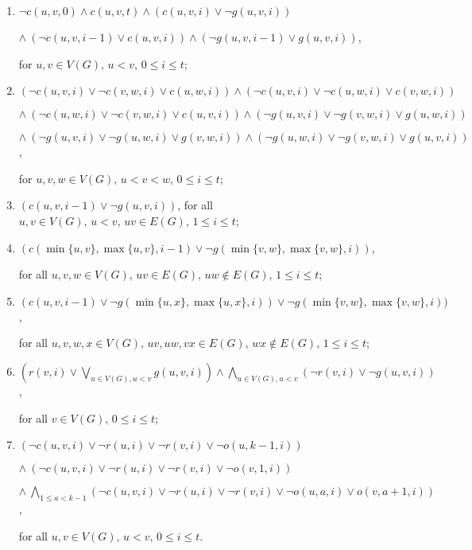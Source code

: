 \begin{enumerate}
	\item $\neg c(u,v,0) \land c(u,v,t) \land (c(u,v,i) \lor \neg g(u,v,i)) $ \vspace{-4pt}
	
	$\land \ (\neg c(u,v,i-1) \lor c(u,v,i))\land (\neg g(u,v,i-1) \lor g(u,v,i))$,
	
	for $u,v \in V(G),\, u<v,\, 0 \leq i \leq t$;
	
	\item $(\neg c(u,v,i) \lor \neg c(v,w,i) \lor c(u,w,i)) \land (\neg c(u,v,i) \lor \neg c(u,w,i) \lor c(v,w,i))$ \vspace{-4pt}
	
	$\land \ (\neg c(u,w,i) \lor \neg c(v,w,i) \lor c(u,v,i)) \land (\neg g(u,v,i) \lor \neg g(v,w,i) \lor g(u,w,i))$ \vspace{-16pt}
	
	$\land \ (\neg g(u,v,i) \lor \neg g(u,w,i) \lor g(v,w,i)) \land (\neg g(u,w,i) \lor \neg g(v,w,i) \lor g(u,v,i))$, \vspace{-12pt}
	
	for $u,v,w \in V(G),\, u<v<w,\, 0 \leq i \leq t$;
	
	\item $(c(u,v,i-1) \lor \neg g(u,v,i))$, for all $u,v \in V(G),\, u<v,\, uv \in E(G),\, 1 \leq i \leq t$;
	
	\item $(c(\min\{u,v\}, \max\{u,v\}, i-1) \lor \neg g(\min\{v,w\}, \max\{v,w\}, i))$,
	
	for all $u,v,w \in V(G),\, uv \in E(G),\, uw \not\in E(G),\, 1 \leq i \leq t$;
	
	\item $(c(u,v,i-1) \lor \neg g(\min\{u,x\}, \max\{u,x\}, i) ) \lor \neg g(\min\{v,w\}, \max\{v,w\}, i) )$,
	
	for all $u,v,w,x \in V(G),\, uv,uw,vx \in E(G),\, wx \not\in E(G),\, 1 \leq i \leq t$;
	
	\item $(r(v,i) \lor \bigvee_{u\in V(G), u<v} g(u,v,i)) \land \bigwedge_{u \in V(G), u<v} (\neg r(v,i) \lor \neg g(u,v,i))$,
	
	for all $v \in V(G),\, 0 \leq i \leq t$;
	
	\item $(\neg c(u,v,i) \lor \neg r(u,i) \lor \neg r(v,i) \lor \neg o(u,k-1,i))$ \vspace{-4pt}
	
	$\land \ (\neg c(u,v,i) \lor \neg r(u,i) \lor \neg r(v,i) \lor \neg o(v,1,i))$ \vspace{-4pt}
	
	$\land \ \bigwedge_{1 \leq a < k-1} (\neg c(u,v,i) \lor \neg r(u,i) \lor \neg r(v,i) \lor \neg o(u,a,i) \lor o(v,a+1,i))$,
	
	for all $u,v \in V(G),\, u<v,\, 0 \leq i \leq t$.
\end{enumerate}
